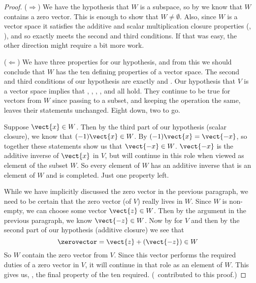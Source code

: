 \begin{proof}
($\Rightarrow$)  We have the hypothesis that $W$ is a subspace, so by  we know that $W$ contains a zero vector.  This is enough to show that $W\neq\emptyset$.  Also, since $W$ is a vector space it satisfies the additive and scalar multiplication closure properties (, ), and so exactly meets the second and third conditions.  If that was easy, the other direction might require a bit more work.\par
%
($\Leftarrow$) We have three properties for our hypothesis, and from this we should conclude that $W$ has the ten defining properties of a vector space.  The second and third conditions of our hypothesis are exactly  and .
Our hypothesis that $V$ is a vector space implies that
,
,
,
,
 and
all hold.  They continue to be true for vectors from $W$ since passing to a subset, and keeping the operation the same, leaves their statements unchanged.  Eight down, two to go.\par
%
Suppose $\vect{x}\in W$.  Then by the third part of our hypothesis (scalar closure), we know that $(-1)\vect{x}\in W$.  By  $(-1)\vect{x}=\vect{-x}$, so together these statements show us that $\vect{-x}\in W$.  $\vect{-x}$ is the additive inverse of $\vect{x}$ in $V$, but will continue in this role when viewed as element of the subset $W$.  So every element of $W$ has an additive inverse that is an element of $W$ and  is completed.  Just one property left.\par
%
While we have implicitly discussed the zero vector in the previous paragraph, we need to be certain that the zero vector (of $V$) really lives in $W$.   Since $W$ is non-empty, we can choose some vector $\vect{z}\in W$.  Then by the argument in the previous paragraph, we know $\vect{-z}\in W$.  Now by  for $V$ and then by the second part of our hypothesis (additive closure) we see that
%
\begin{equation*}
\zerovector=\vect{z}+(\vect{-z})\in W
\end{equation*}
%
So $W$ contain the zero vector from $V$.  Since this vector performs the required duties of a zero vector in $V$, it will continue in that role as an element of $W$. This gives us, , the final property of the ten required.  (\sarahfellez\ contributed to this proof.)\par
%
\end{proof}
